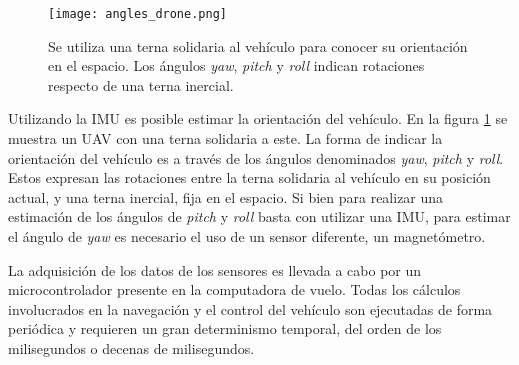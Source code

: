 \begin{figure}[htb]
    \centering
    \texttt{[image: angles\_drone.png]}
    \caption{Se utiliza una terna solidaria al vehículo para conocer su orientación en el espacio. Los ángulos \textit{yaw}, \textit{pitch} y \textit{roll} indican rotaciones respecto de una terna inercial.}
    \label{fig:angles_drone}    
\end{figure}

Utilizando la IMU es posible estimar la orientación del vehículo. En la figura \ref{fig:angles_drone} se muestra un UAV con una terna solidaria a este. La forma de indicar la orientación del vehículo es a través de los ángulos denominados \textit{yaw}, \textit{pitch} y \textit{roll}. Estos expresan las rotaciones entre la terna solidaria al vehículo en su posición actual, y una terna inercial, fija en el espacio. Si bien para realizar una estimación de los ángulos de \textit{pitch} y \textit{roll} basta con utilizar una IMU, para estimar el ángulo de \textit{yaw} es necesario el uso de un sensor diferente, un magnetómetro. 

La adquisición de los datos de los sensores es llevada a cabo por un microcontrolador presente en la computadora de vuelo. Todas los cálculos involucrados en la navegación y el control del vehículo son ejecutadas de forma periódica y requieren un gran determinismo temporal, del orden de los milisegundos o decenas de milisegundos.











